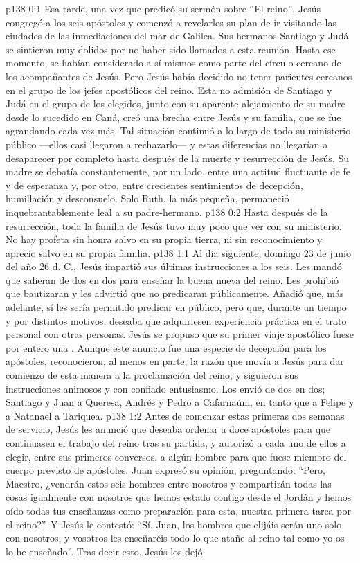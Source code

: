 \author{Comisión de seres intermedios}
\vs p138 0:1 Esa tarde, una vez que predicó su sermón sobre “El reino”, Jesús congregó a los seis apóstoles y comenzó a revelarles su plan de ir visitando las ciudades de las inmediaciones del mar de Galilea. Sus hermanos Santiago y Judá se sintieron muy dolidos por no haber sido llamados a esta reunión. Hasta ese momento, se habían considerado a sí mismos como parte del círculo cercano de los acompañantes de Jesús. Pero Jesús había decidido no tener parientes cercanos en el grupo de los jefes apostólicos del reino. Esta no admisión de Santiago y Judá en el grupo de los elegidos, junto con su aparente alejamiento de su madre desde lo sucedido en Caná, creó una brecha entre Jesús y su familia, que se fue agrandando cada vez más. Tal situación continuó a lo largo de todo su ministerio público ---ellos casi llegaron a rechazarlo--- y estas diferencias no llegarían a desaparecer por completo hasta después de la muerte y resurrección de Jesús. Su madre se debatía constantemente, por un lado, entre una actitud fluctuante de fe y de esperanza y, por otro, entre crecientes sentimientos de decepción, humillación y desconsuelo. Solo Ruth, la más pequeña, permaneció inquebrantablemente leal a su padre\hyp{}hermano.
\vs p138 0:2 Hasta después de la resurrección, toda la familia de Jesús tuvo muy poco que ver con su ministerio. No hay profeta sin honra salvo en su propia tierra, ni sin reconocimiento y aprecio salvo en su propia familia.
\vs p138 1:1 Al día siguiente, domingo 23 de junio del año 26 d. C., Jesús impartió sus últimas instrucciones a los seis. Les mandó que salieran de dos en dos para enseñar la buena nueva del reino. Les prohibió que bautizaran y les advirtió que no predicaran públicamente. Añadió que, más adelante, sí les sería permitido predicar en público, pero que, durante un tiempo y por distintos motivos, deseaba que adquiriesen experiencia práctica en el trato personal con otras personas. Jesús se propuso que su primer viaje apostólico fuese por entero una . Aunque este anuncio fue una especie de decepción para los apóstoles, reconocieron, al menos en parte, la razón que movía a Jesús para dar comienzo de esta manera a la proclamación del reino, y siguieron sus instrucciones animosos y con confiado entusiasmo. Los envió de dos en dos; Santiago y Juan a Queresa, Andrés y Pedro a Cafarnaúm, en tanto que a Felipe y a Natanael a Tariquea.
\vs p138 1:2 Antes de comenzar estas primeras dos semanas de servicio, Jesús les anunció que deseaba ordenar a doce apóstoles para que continuasen el trabajo del reino tras su partida, y autorizó a cada uno de ellos a elegir, entre sus primeros conversos, a algún hombre para que fuese miembro del cuerpo previsto de apóstoles. Juan expresó su opinión, preguntando: “Pero, Maestro, ¿vendrán estos seis hombres entre nosotros y compartirán todas las cosas igualmente con nosotros que hemos estado contigo desde el Jordán y hemos oído todas tus enseñanzas como preparación para esta, nuestra primera tarea por el reino?”. Y Jesús le contestó: “Sí, Juan, los hombres que elijáis serán uno solo con nosotros, y vosotros les enseñaréis todo lo que atañe al reino tal como yo os lo he enseñado”. Tras decir esto, Jesús los dejó.
